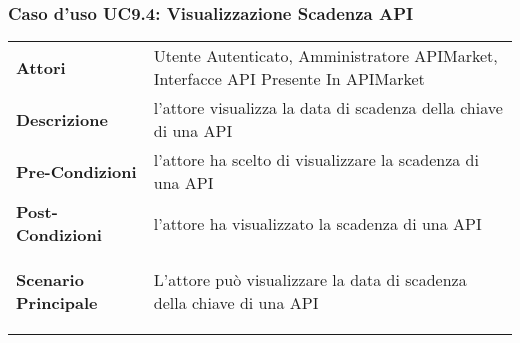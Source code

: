 \subsubsection{Caso d'uso UC9.4: Visualizzazione Scadenza API}
\label{UC9.4}

\renewcommand*{\arraystretch}{1.6}
\begin{longtable}{ l | p{11cm}}
	\hline
	\rowcolor{Gray}
	\multicolumn{2}{c}{UC9.4: Visualizzazione Scadenza API} \\
	\hline
	\textbf{Attori} &Utente Autenticato, Amministratore APIMarket, Interfacce API Presente In APIMarket \\
	\textbf{Descrizione} & l'attore visualizza la data di scadenza della chiave di una API \\
	\textbf{Pre-Condizioni} &l'attore ha scelto di visualizzare la scadenza di una API\\
	\textbf{Post-Condizioni}& l'attore ha visualizzato la scadenza di una API\\
	\textbf{Scenario Principale} & \begin{enumerate*}[label=(\arabic*.),itemjoin={\newline}]
		\item L'attore può visualizzare la data di scadenza della chiave di una API
	\end{enumerate*}\\
\end{longtable}